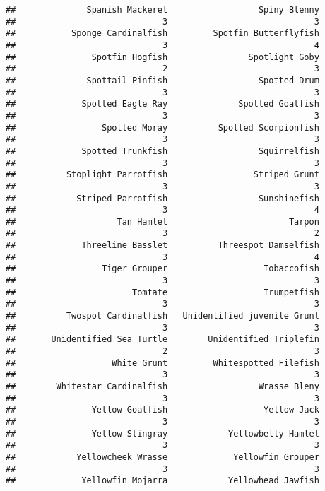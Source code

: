 \documentclass[
]{article}
\begin{document}
\begin{verbatim}
##              Spanish Mackerel                  Spiny Blenny 
##                             3                             3 
##           Sponge Cardinalfish         Spotfin Butterflyfish 
##                             3                             4 
##               Spotfin Hogfish                Spotlight Goby 
##                             2                             3 
##              Spottail Pinfish                  Spotted Drum 
##                             3                             3 
##             Spotted Eagle Ray              Spotted Goatfish 
##                             3                             3 
##                 Spotted Moray          Spotted Scorpionfish 
##                             3                             3 
##             Spotted Trunkfish                  Squirrelfish 
##                             3                             3 
##          Stoplight Parrotfish                 Striped Grunt 
##                             3                             3 
##            Striped Parrotfish                  Sunshinefish 
##                             3                             4 
##                    Tan Hamlet                        Tarpon 
##                             3                             2 
##             Threeline Basslet          Threespot Damselfish 
##                             3                             4 
##                 Tiger Grouper                   Tobaccofish 
##                             3                             3 
##                       Tomtate                   Trumpetfish 
##                             3                             3 
##          Twospot Cardinalfish   Unidentified juvenile Grunt 
##                             3                             3 
##       Unidentified Sea Turtle        Unidentified Triplefin 
##                             2                             3 
##                   White Grunt         Whitespotted Filefish 
##                             3                             3 
##        Whitestar Cardinalfish                  Wrasse Bleny 
##                             3                             3 
##               Yellow Goatfish                   Yellow Jack 
##                             3                             3 
##               Yellow Stingray            Yellowbelly Hamlet 
##                             3                             3 
##            Yellowcheek Wrasse             Yellowfin Grouper 
##                             3                             3 
##             Yellowfin Mojarra            Yellowhead Jawfish 

\end{verbatim}
\end{document}
